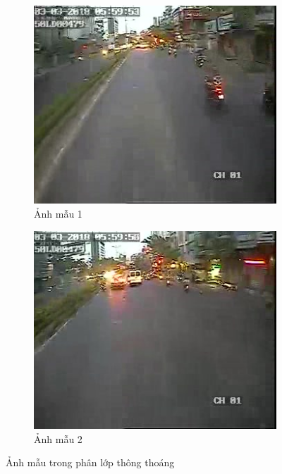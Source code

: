 	\begin{figure}[h!]
  \centering
  \begin{subfigure}[b]{0.4\linewidth}
    \includegraphics[width=\linewidth]{charts/image0125.jpg}
    \caption{Ảnh mẫu 1}
  \end{subfigure}
  \begin{subfigure}[b]{0.4\linewidth}
    \includegraphics[width=\linewidth]{charts/image0126.jpg}
    \caption{Ảnh mẫu 2}
  \end{subfigure}
  \label{fig:sample1}
  \caption{Ảnh mẫu trong phân lớp thông thoáng}
\end{figure}


